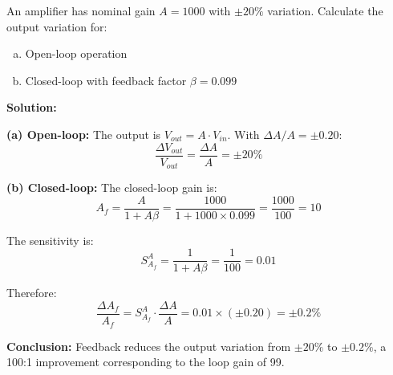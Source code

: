 \begin{examplebox}
An amplifier has nominal gain $A = 1000$ with $\pm 20\%$ variation. Calculate the output variation for:
\begin{enumerate}[(a)]
\item Open-loop operation
\item Closed-loop with feedback factor $\beta = 0.099$
\end{enumerate}

\textbf{Solution:}

\textbf{(a) Open-loop:}
The output is $V_{out} = A \cdot V_{in}$. With $\Delta A / A = \pm 0.20$:
\begin{equation}
\frac{\Delta V_{out}}{V_{out}} = \frac{\Delta A}{A} = \pm 20\%
\end{equation}

\textbf{(b) Closed-loop:}
The closed-loop gain is:
\begin{equation}
A_f = \frac{A}{1 + A\beta} = \frac{1000}{1 + 1000 \times 0.099} = \frac{1000}{100} = 10
\end{equation}

The sensitivity is:
\begin{equation}
S^A_{A_f} = \frac{1}{1 + A\beta} = \frac{1}{100} = 0.01
\end{equation}

Therefore:
\begin{equation}
\frac{\Delta A_f}{A_f} = S^A_{A_f} \cdot \frac{\Delta A}{A} = 0.01 \times (\pm 0.20) = \pm 0.2\%
\end{equation}

\textbf{Conclusion:} Feedback reduces the output variation from $\pm 20\%$ to $\pm 0.2\%$, a 100:1 improvement corresponding to the loop gain of 99.
\end{examplebox}


